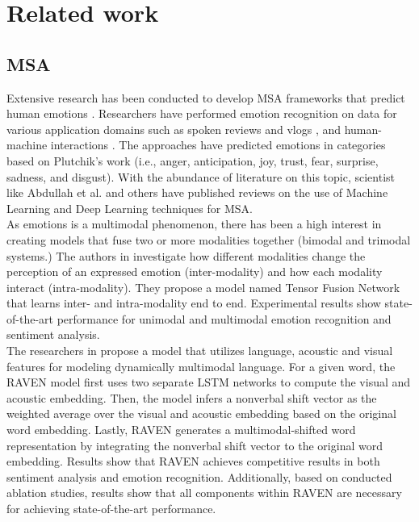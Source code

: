 \chapter{Related work}
\label{chap:related_work}
\section{MSA}
Extensive research has been conducted to develop MSA frameworks that predict human emotions \cite{sebe2005multimodal}. Researchers have performed emotion recognition on data for various application domains such as spoken reviews and vlogs \cite{wollmer2013youtube}, and human-machine interactions \cite{human_machine_langlet2015}. The approaches have predicted emotions in categories based on Plutchik's work (i.e., anger, anticipation, joy, trust, fear, surprise, sadness, and disgust). With the abundance of literature on this topic, scientist like Abdullah et al. \cite{DL_abdullah2021multimodal} and others \cite{sebe2005multimodal} \cite{MER_book_Sharma2021} have published reviews on the use of Machine Learning and Deep Learning techniques for MSA. \\ 

As emotions is a multimodal phenomenon, there has been a high interest in creating models that fuse two or more modalities together (bimodal and trimodal systems.) The authors in \cite{tensor_fusion_network_2017} investigate how different modalities change the perception of an expressed emotion (inter-modality) and how each modality interact (intra-modality). They propose a model named Tensor Fusion Network that learns inter- and intra-modality end to end. Experimental results show state-of-the-art performance for unimodal and multimodal emotion recognition and sentiment analysis. \\

The researchers in \cite{Wang2018} propose a model that utilizes language, acoustic and visual features for modeling dynamically multimodal language. For a given word, the RAVEN model first uses two separate LSTM networks to compute the visual and acoustic embedding. Then, the model infers a nonverbal shift vector as the weighted average  over the visual and acoustic embedding based on the original word embedding. Lastly, RAVEN generates a  multimodal-shifted word representation by integrating the nonverbal shift vector to the original word embedding. Results show that RAVEN achieves competitive results in both sentiment analysis and emotion recognition. Additionally, based on conducted ablation studies, results show that all components within RAVEN are necessary for achieving state-of-the-art performance. \\


